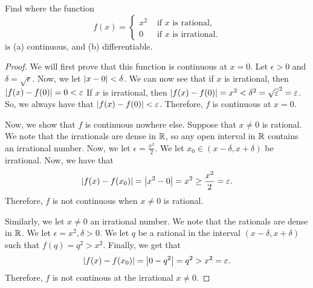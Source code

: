 \documentclass{article}
\begin{document}
    \newpage
    Find where the function
    \begin{equation*}
        f(x) =
        \begin{cases}
            x^{2} & \text{ if } x \text{ is rational},\\
            0  & \text{ if } x \text{ is irrational}.
        \end{cases}
    \end{equation*}
    is (a) continuous, and (b) differentiable.

    \begin{proof}
        We will first prove that this function is continuous at $x=0$. Let $\epsilon > 0$ and $\delta = \sqrt{\epsilon}$.
        Now, we let $\abs{x - 0} < \delta$. We can now see that if $x$ is irrational, then $\abs{f(x) - f(0)} = 0 < \varepsilon$
        If $x$ is irrational, then $\abs{f(x) - f(0)} = x^{2} < \delta^{2} = \sqrt{\varepsilon}^{2} = \varepsilon $.
        So, we always have that $\abs{f(x) - f(0)} < \varepsilon$. Therefore, $f$ is continuous at $x = 0$.

        Now, we show that $f$ is continuous nowhere else. Suppose that $x \neq 0$ is rational. We note that the irrationals are dense
        in $\mathbb{R}$, so any open interval in $\mathbb{R}$ contains an irrational number. Now, we let $\epsilon = \frac{x^{2}}{2}$. We let
        $x_{0} \in (x -\delta, x + \delta)$ be irrational. Now, we have that 
        \begin{equation*}
            \abs{f(x) - f(x_{0})} = \abs{x^{2} - 0} = x^{2} \geq \frac{x^{2}}{2} = \varepsilon.
        \end{equation*}
        Therefore, $f$ is not continuous when $x \neq 0$ is rational.

        Similarly, we let $x \neq 0$ an irrational number. We note that the rationals are dense in $\mathbb{R}$. We let 
        $\epsilon = x^{2}, \delta > 0$. We let $q$ be a rational in the interval $(x - \delta, x + \delta)$ such that
        $f(q) = q^{2} > x^{2}$. Finally, we get that
        \begin{equation*}
            \abs{f(x) - f(x_{0})} = \abs{0 - q^{2}} = q^{2} > x^{2} = \varepsilon.
        \end{equation*}
        Therefore, $f$ is not continous at the irrational $x \neq 0$.
    \end{proof}
\end{document}
